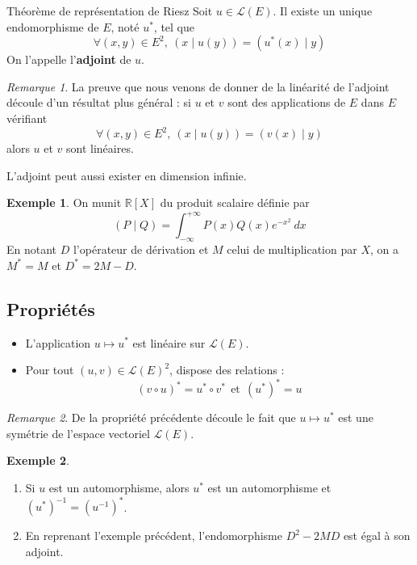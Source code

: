\documentclass[french]{article}
\newcommand{\R}{\mathbb{R}}
\newcommand{\st}{^*}
\newcommand{\inv}{^{-1}}
\theoremstyle{plain}
\theoremstyle{definition}
\newtheorem*{ex}{Exemple}
\theoremstyle{remark}
\newtheorem*{rmq}{Remarque}
\begin{document}
\begin{thm}{Théorème de représentation de Riesz}
	Soit $u\in\mathcal{L}(E)$. Il existe un unique endomorphisme de $E$, noté $u\st$, tel que $$\forall (x,y)\in E^2,\ (x\mid u(y))=(u\st(x)\mid y)$$ On l'appelle l'\textbf{adjoint} de $u$.
\end{thm}

\begin{rmq}
	La preuve que nous venons de donner de la linéarité de l'adjoint découle d'un résultat plus général : si $u$ et $v$ sont des applications de $E$ dans $E$ vérifiant $$\forall (x,y)\in E^2,\ (x\mid u(y))=(v(x)\mid y)$$ alors $u$ et $v$ sont linéaires.
\end{rmq}

L'adjoint peut aussi exister en dimension infinie.
\begin{ex}
	On munit $\R[X]$ du produit scalaire définie par $$(P\mid Q)=\int_{-\infty}^{+\infty}P(x)Q(x)e^{-x^2}\ dx$$ En notant $D$ l'opérateur de dérivation et $M$ celui de multiplication par $X$, on a $M\st=M$ et $D\st=2M-D$.
\end{ex}

\subsection{Propriétés}

\begin{thm}{}
	\begin{itemize}
		\item L'application $u\mapsto u\st$ est linéaire sur $\mathcal{L}(E)$.
		\item Pour tout $(u,v)\in \mathcal{L}(E)^2$, dispose des relations : $$(v\circ u)\st=u\st\circ v\st \ \ \text{et}\ \ (u\st)\st=u$$
	\end{itemize}
\end{thm}

\begin{rmq}
	De la propriété précédente découle le fait que $u\mapsto u\st$ est une symétrie de l'espace vectoriel $\mathcal{L}(E)$.
\end{rmq}

\begin{ex}
	\begin{enumerate}
		\item Si $u$ est un automorphisme, alors $u\st$ est un automorphisme et $(u\st)\inv=(u\inv)\st$.
		\item En reprenant l'exemple précédent, l'endomorphisme $D^2-2MD$ est égal à son adjoint.
	\end{enumerate}
\end{ex}
\end{document}
